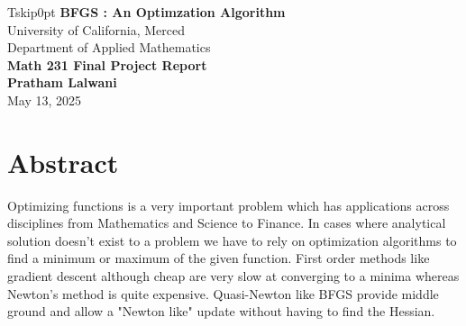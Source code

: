 \documentclass[12pt]{report}
\date{}
\begin{document}
\begin{titlepage}
	Tskip0pt
	\centering
	\vspace*{\fill}
	{\bf \LARGE BFGS : An Optimzation Algorithm\\}
	\vspace{1cm}
	{\Large University of California, Merced\\}
	\vspace{0.5cm}
	{\large Department of Applied Mathematics\\}
	\vspace{1.5cm}
	{\bf \Large Math 231 Final Project Report\\}
	\vspace{1.5cm}
	{\bf \Large Pratham Lalwani\\}
	\vspace{2cm}
	{\large May 13, 2025\\}
	\vspace*{\fill}
\end{titlepage}

\clearpage
\setcounter{page}{1}
\renewcommand{\thepage}{\roman{page}}

%

\chapter*{Abstract}
Optimizing functions is a very important problem which has applications across disciplines from Mathematics and Science to Finance. In cases where analytical solution doesn't exist to a problem we have to rely on optimization algorithms to find a minimum or maximum of the given function. First order methods like gradient descent although cheap are very slow at converging to a minima whereas Newton's method is quite expensive. Quasi-Newton like BFGS provide middle ground and allow a "Newton like" update without having to find the Hessian.
\end{document}
